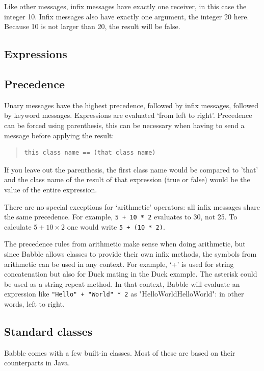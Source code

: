\documentclass[a4paper]{article}
\begin{document}
Like other messages, infix messages have exactly one receiver, in this case the integer 10.
Infix messages also have exactly one argument, the integer 20 here.
Because 10 is not larger than 20, the result will be false.

\subsection{Expressions}

\subsection{Precedence}

Unary messages have the highest precedence, followed by infix messages, followed by keyword messages. Expressions are evaluated `from left to right'. Precedence can be forced using parenthesis, this can be necessary when having to send a message before applying the result:
\begin{quote}
\begin{lstlisting}
this class name == (that class name)
\end{lstlisting}
\end{quote}
If you leave out the parenthesis, the first class name would be compared to 'that' and the class name of the result of that expression (true or false) would be the value of the entire expression.

There are no special exceptions for `arithmetic' operators: all infix messages share the same precedence.
For example, \texttt{5 + 10 * 2} evaluates to 30, not 25.
To calculate $5 + 10 \times 2$ one would write \texttt{5 + (10 * 2)}.

The precedence rules from arithmetic make sense when doing arithmetic, but since Babble allows classes to provide their own infix methods, the symbols from arithmetic can be used in any context.
For example, `+' is used for string concatenation but also for Duck mating in the Duck example.
The asterisk could  be used as a string repeat method.
In that context, Babble will evaluate an expression like \texttt{"Hello" + "World" * 2} as "HelloWorldHelloWorld": in other words, left to right.

\subsection{Standard classes}

Babble comes with a few built-in classes. Most of these are based on their counterparts in Java.
\end{document}
